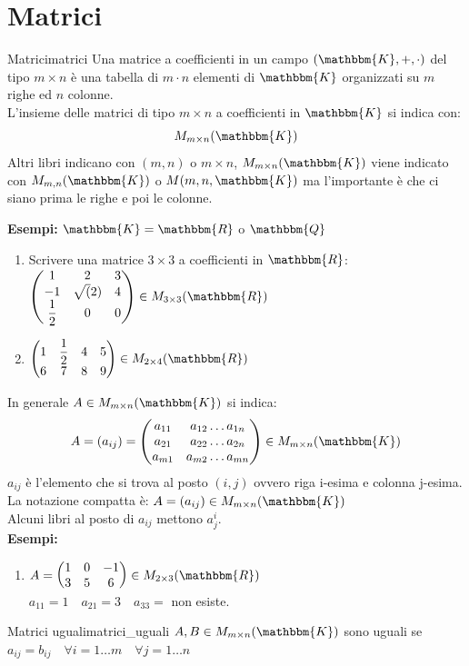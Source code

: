 \documentclass[12pt, letterpaper]{report}
\newcounter{definition}
\newcommand{\nmu}{}
\begin{document}
 		\chapter{Matrici}
 		\begin{definition}{\nmu Matrici}{matrici}
 			Una matrice a coefficienti in un campo $(\mathbbm{K}, +, \cdot)$ del tipo $m \times n$ è una tabella di $m \cdot n$ elementi di $\mathbbm{K}$ organizzati su $m$ righe ed $n$ colonne. \\
 			L'insieme delle matrici di tipo $m \times n$ a coefficienti in $\mathbbm{K}$ si indica con:
 			\[
 			M_{m \times n}(\mathbbm{K})
 			\]
 			Altri libri indicano con $(m,n)$ o $m \times n$, $M_{m \times n}(\mathbbm{K})$ viene indicato con  $M_{m, n}(\mathbbm{K})$ o $M(m, n,\mathbbm{K})$ ma l'importante è che ci siano prima le righe e poi le colonne.
 		\end{definition}
 		\textbf{Esempi:} $\mathbbm{K} = \mathbbm{R}$ o $\mathbbm{Q}$
 		\begin{enumerate}
 			\item Scrivere una matrice $3 \times 3$ a coefficienti in $\mathbbm{R}$: \\
 			$\begin{pmatrix}
 				1 & 2 & 3 \\
 				-1 & \sqrt(2) & 4 \\
 				\dfrac{1}{2} & 0 & 0
 			\end{pmatrix} \in M_{3 \times 3}(\mathbbm{R})$
 			\item $\begin{pmatrix}
 				1 & \dfrac{1}{2} & 4 & 5 \\
 				6 & 7 & 8 & 9
 			\end{pmatrix} \in M_{2 \times 4}(\mathbbm{R})$
 		\end{enumerate}
 		In generale $A \in M_{m \times n}(\mathbbm{K})$ si indica:
 		\[
 		A = (a_{ij}) = \begin{pmatrix}
 			a_{11} & a_{12} \dots a_{1n} \\
 			a_{21} & a_{22} \dots a_{2n} \\
 			a_{m1} & a_{m2} \dots a_{mn}
 		\end{pmatrix} \in M_{m \times n}(\mathbbm{K})
 		\]
 		$a_{ij}$ è l'elemento che si trova al posto $(i, j)$ ovvero riga i-esima e colonna j-esima. La notazione compatta è: $A = (a_{ij}) \in M_{m \times n}(\mathbbm{K})$ \\
 		Alcuni libri al posto di $a_{ij}$ mettono $a^i_j$. \\
 		\textbf{Esempi:}
 		\begin{enumerate}
 			\item $A = \begin{pmatrix}
 				1 & 0 & -1 \\
 				3 & 5 & 6
 			\end{pmatrix} \in M_{2 \times 3}(\mathbbm{R})$ \\
 			$a_{11} = 1 \quad a_{21} = 3 \quad a_{33} = $ non esiste.
 		\end{enumerate}
 		\begin{definition}{\nmu Matrici uguali}{matrici_uguali}
 			$A, B \in M_{m \times n}(\mathbbm{K})$ sono uguali se $a_{ij} = b_{ij} \quad \forall i = 1\dots m \quad \forall j = 1 \dots n$
 		\end{definition}
\end{document}
